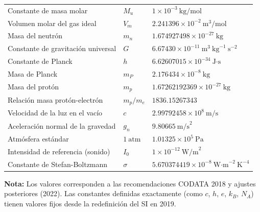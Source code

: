\documentclass[12pt]{article}
\begin{document}
\begin{longtable}{p{} p{} p{}}
Constante de masa molar & $M_u$ & $1 \times 10^{-3}\ \text{kg/mol}$ \\
Volumen molar del gas ideal & $V_m$ & $2.241396 \times 10^{-2}\ \text{m}^3/\text{mol}$ \\
Masa del neutrón & $m_n$ & $1.674927498 \times 10^{-27}\ \text{kg}$ \\
Constante de gravitación universal & $G$ & $6.67430 \times 10^{-11}\ \text{m}^3\ \text{kg}^{-1}\ \text{s}^{-2}$ \\
Constante de Planck & $h$ & $6.62607015 \times 10^{-34}\ \text{J·s}$ \\
Masa de Planck & $m_P$ & $2.176434 \times 10^{-8}\ \text{kg}$ \\
Masa del protón & $m_p$ & $1.67262192369 \times 10^{-27}\ \text{kg}$ \\
Relación masa protón-electrón & $m_p/m_e$ & $1836.15267343$ \\
Velocidad de la luz en el vacío & $c$ & $2.99792458 \times 10^{8}\ \text{m/s}$ \\
Aceleración normal de la gravedad & $g_n$ & $9.80665\ \text{m/s}^2$ \\
Atmósfera estándar & $1\ \text{atm}$ & $1.01325 \times 10^{5}\ \text{Pa}$ \\
Intensidad de referencia (sonido) & $I_0$ & $1 \times 10^{-12}\ \text{W/m}^2$ \\
Constante de Stefan-Boltzmann & $\sigma$ & $5.670374419 \times 10^{-8}\ \text{W·m}^{-2}\ \text{K}^{-4}$ \\
\end{longtable}

\vspace{1cm}
\noindent
\textbf{Nota:} Los valores corresponden a las recomendaciones CODATA 2018 y ajustes posteriores (2022). Las constantes definidas exactamente (como $c$, $h$, $e$, $k_B$, $N_A$) tienen valores fijos desde la redefinición del SI en 2019.
\end{document}
